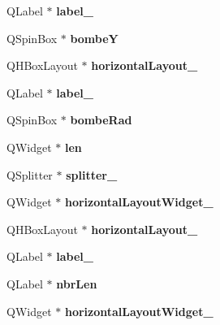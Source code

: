 \begin{DoxyCompactItemize}
Q\+Label $\ast$ {\bfseries label\+\_}
\item 
\mbox{\label{class_ui__generateur_a0be144eb233421437edf286e0098204f}} 
Q\+Spin\+Box $\ast$ {\bfseries bombeY}
\item 
\mbox{\label{class_ui__generateur_ade24d704947a1af74ce72f87af578e2d}} 
Q\+H\+Box\+Layout $\ast$ {\bfseries horizontal\+Layout\+\_}
\item 
\mbox{\label{class_ui__generateur_a1c7afd457990be0db7bb21f19f1b0bfb}} 
Q\+Label $\ast$ {\bfseries label\+\_}
\item 
\mbox{\label{class_ui__generateur_ab7be9e63f10e2d4b2fe5ed8098a485c3}} 
Q\+Spin\+Box $\ast$ {\bfseries bombe\+Rad}
\item 
\mbox{\label{class_ui__generateur_a3391fa3547197cac4f8391573651ff22}} 
Q\+Widget $\ast$ {\bfseries len}
\item 
\mbox{\label{class_ui__generateur_a153d5085ea3ea082b83eb2880b97b69e}} 
Q\+Splitter $\ast$ {\bfseries splitter\+\_}
\item 
\mbox{\label{class_ui__generateur_a86359a38da92d7d69769653e17cbb784}} 
Q\+Widget $\ast$ {\bfseries horizontal\+Layout\+Widget\+\_}
\item 
\mbox{\label{class_ui__generateur_ac147f99cf3b033e45fc9211a3347bf2a}} 
Q\+H\+Box\+Layout $\ast$ {\bfseries horizontal\+Layout\+\_}
\item 
\mbox{\label{class_ui__generateur_aea92ae29725554f265e07a5805b4e37e}} 
Q\+Label $\ast$ {\bfseries label\+\_}
\item 
\mbox{\label{class_ui__generateur_ac42e9dd9d80a16e2eccdf10d0ee1ed78}} 
Q\+Label $\ast$ {\bfseries nbr\+Len}
\item 
\mbox{\label{class_ui__generateur_a92ed5b0f54746b16edea66db8e49a5b3}} 
Q\+Widget $\ast$ {\bfseries horizontal\+Layout\+Widget\+\_}

\end{DoxyCompactItemize}
